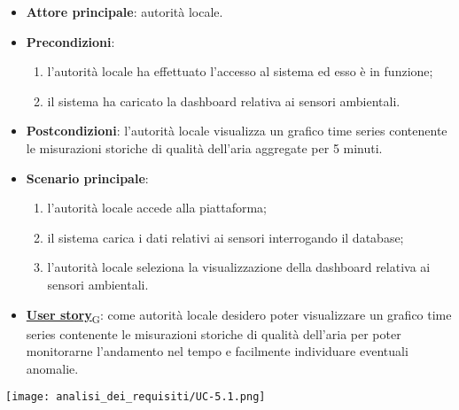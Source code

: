 \begin{itemize}
	\item \textbf{Attore principale}: autorità locale.
	\item \textbf{Precondizioni}:
	      \begin{enumerate}
		      \item l'autorità locale ha effettuato l'accesso al sistema ed esso è in funzione;
		      \item il sistema ha caricato la dashboard relativa ai sensori ambientali.
	      \end{enumerate}
	\item \textbf{Postcondizioni}: l'autorità locale visualizza un grafico time series contenente le misurazioni storiche
	      di qualità dell'aria aggregate per 5 minuti.
	\item \textbf{Scenario principale}:
	      \begin{enumerate}
		      \item l'autorità locale accede alla piattaforma;
		      \item il sistema carica i dati relativi ai sensori interrogando il database;
		      \item l'autorità locale seleziona la visualizzazione della dashboard relativa ai sensori ambientali.
	      \end{enumerate}
	\item \href{https://7last.github.io/docs/pb/documentazione-interna/glossario\#user-story}{\textbf{User story}\textsubscript{G}}:
	      come autorità locale desidero poter visualizzare un grafico time series contenente le misurazioni storiche
	      di qualità dell'aria per poter monitorarne l'andamento nel tempo e facilmente individuare eventuali anomalie.
\end{itemize}
\begin{center}
	\texttt{[image: analisi\_dei\_requisiti/UC-5.1.png]}
\end{center}


